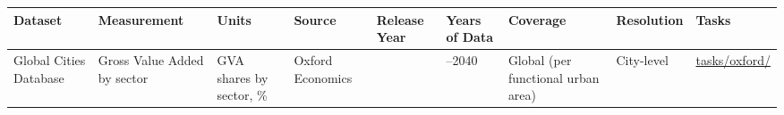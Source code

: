 \documentclass[
  letterpaper,
  DIV=11,
  numbers=noendperiod]{scrreprt}
\newcounter{none} %
\begin{document}
{\def\LTcaptype{none} %
\begin{longtable}[]{@{}
  >{\raggedright\arraybackslash}p{}
  >{\raggedright\arraybackslash}p{}
  >{\raggedright\arraybackslash}p{}
  >{\raggedright\arraybackslash}p{}
  >{\raggedright\arraybackslash}p{}
  >{\raggedright\arraybackslash}p{}
  >{\raggedright\arraybackslash}p{}
  >{\raggedright\arraybackslash}p{}
  >{\raggedright\arraybackslash}p{}@{}}
\toprule\noalign{}
\begin{minipage}[b]{\linewidth}\raggedright
Dataset
\end{minipage} & \begin{minipage}[b]{\linewidth}\raggedright
Measurement
\end{minipage} & \begin{minipage}[b]{\linewidth}\raggedright
Units
\end{minipage} & \begin{minipage}[b]{\linewidth}\raggedright
Source
\end{minipage} & \begin{minipage}[b]{\linewidth}\raggedright
Release Year
\end{minipage} & \begin{minipage}[b]{\linewidth}\raggedright
Years of Data
\end{minipage} & \begin{minipage}[b]{\linewidth}\raggedright
Coverage
\end{minipage} & \begin{minipage}[b]{\linewidth}\raggedright
Resolution
\end{minipage} & \begin{minipage}[b]{\linewidth}\raggedright
Tasks
\end{minipage} \\
\midrule\noalign{}
\endhead
\bottomrule\noalign{}
\endlastfoot
Global Cities Database & Gross Value Added by sector & GVA shares by
sector, \% & Oxford Economics & 2022 & 2000--2040 & Global (per
functional urban area) & City-level &
\href{../tasks/oxford/}{tasks/oxford/} \\
\end{longtable}
}
\end{document}
